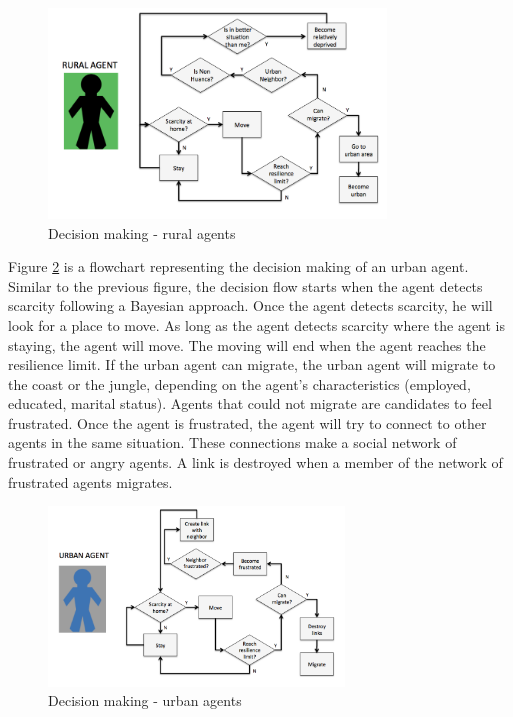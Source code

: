 \documentclass[doc,12pt,floatsintext]{apa7}
\begin{document}
\begin{figure}[ht]
\centering
  \includegraphics[width=0.8\textwidth]{ruralLogic}
  \caption[Decision making - rural agents]{Decision making - rural agents}
  \label{ruralLogic}
\end{figure}

Figure \ref{urbanLogic} is a flowchart representing the decision making of an urban agent. Similar to the previous figure, the decision flow starts when the agent detects scarcity following a Bayesian approach. Once the agent detects scarcity, he will look for a place to move. As long as the agent detects scarcity where the agent is staying, the agent will move. The moving will end when the agent reaches the resilience limit. If the urban agent can migrate, the urban agent will migrate to the coast or the jungle, depending on the agent's characteristics (employed, educated, marital status). Agents that could not migrate are candidates to feel frustrated. Once the agent is frustrated, the agent will try to connect to other agents in the same situation. These connections make a social network of frustrated or angry agents. A link is destroyed when a member of the network of frustrated agents migrates.

\begin{figure}[ht]
\centering
  \includegraphics[width=0.7\textwidth]{urbanLogic}
  \caption[Decision making - urban agents]{Decision making - urban agents}
  \label{urbanLogic}
\end{figure}
\end{document}
